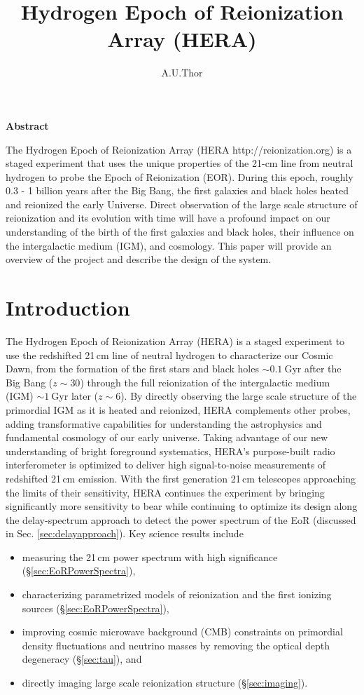 \documentclass[preprint,11pt]{aastex}
\title{Hydrogen Epoch of Reionization Array (HERA)}
\author{A.U.Thor}
\begin{document}
\maketitle

\begin{center}
\textbf{Abstract}
\end{center}

The Hydrogen Epoch of Reionization Array (HERA http://reionization.org) is a staged experiment that uses the unique properties of the 21-cm line from neutral hydrogen to probe the Epoch of Reionization (EOR). During this epoch, roughly 0.3 - 1 billion years after the Big Bang, the first galaxies and black holes heated and reionized the early Universe. Direct observation of the large scale structure of reionization and its evolution with time will have a profound impact on our understanding of the birth of the first galaxies and black holes, their influence on the intergalactic medium (IGM), and cosmology.  This paper will provide an overview of the project and describe the design of the system.

\section{Introduction}

\noindent The Hydrogen Epoch of Reionization Array (HERA) is a staged experiment to use the redshifted 21\,cm line
of neutral hydrogen to characterize our Cosmic Dawn, from
the formation of the first stars and black holes $\sim0.1~$Gyr after the Big
Bang ($z\sim30$) through the full reionization of the intergalactic medium
(IGM) $\sim1~$Gyr later ($z\sim6$).  By directly observing the large scale
structure of the primordial IGM as it is heated and reionized, HERA complements
other probes, adding transformative capabilities for
understanding the astrophysics and fundamental cosmology of our early universe.
Taking advantage of our new understanding of bright foreground systematics, HERA's
purpose-built radio
interferometer is optimized to deliver high signal-to-noise measurements of
redshifted 21\,cm emission.
With the first generation 21\,cm telescopes approaching the limits of their sensitivity, HERA continues the experiment by bringing significantly more sensitivity to bear
while continuing to optimize its design along the delay-spectrum approach to detect the power spectrum of the EoR (discussed in Sec. \ref{sec:delayapproach}).
Key science results include
\begin{itemize}[noitemsep,nolistsep]
\item measuring the 21\,cm power spectrum with high significance (\S\ref{sec:EoRPowerSpectra}),
\item characterizing parametrized models of reionization and the first ionizing sources (\S\ref{sec:EoRPowerSpectra}),
\item improving cosmic microwave background (CMB) constraints on primordial density fluctuations and neutrino masses by removing the optical depth degeneracy (\S\ref{sec:tau}), and
\item directly imaging large scale reionization structure (\S\ref{sec:imaging}).
\end{itemize}
\end{document}
